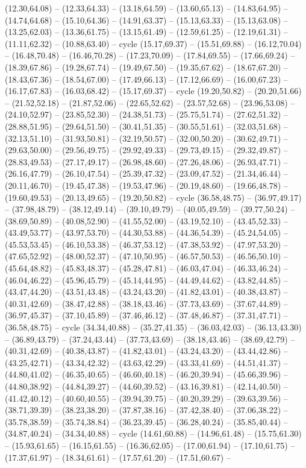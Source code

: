 {(12.30,64.08) -- (12.33,64.33) -- (13.18,64.59) -- (13.60,65.13) -- (14.83,64.95) -- (14.74,64.68) -- (15.10,64.36) -- (14.91,63.37) -- (15.13,63.33) -- (15.13,63.08) -- (13.25,62.03) -- (13.36,61.75) -- (13.15,61.49) -- (12.59,61.25) -- (12.19,61.31) -- (11.11,62.32) -- (10.88,63.40) -- cycle (15.17,69.37) -- (15.51,69.88) -- (16.12,70.04) -- (16.48,70.48) -- (16.46,70.28) -- (17.23,70.09) -- (17.84,69.55) -- (17.66,69.24) -- (18.39,67.86) -- (19.28,67.74) -- (19.49,67.50) -- (19.35,67.62) -- (18.67,67.20) -- (18.43,67.36) -- (18.54,67.00) -- (17.49,66.13) -- (17.12,66.69) -- (16.00,67.23) -- (16.17,67.83) -- (16.03,68.42) -- (15.17,69.37) -- cycle (19.20,50.82) -- (20.20,51.66) -- (21.52,52.18) -- (21.87,52.06) -- (22.65,52.62) -- (23.57,52.68) -- (23.96,53.08) -- (24.10,52.97) -- (23.85,52.30) -- (24.38,51.73) -- (25.75,51.74) -- (27.62,51.32) -- (28.88,51.95) -- (29.64,51.50) -- (30.41,51.35) -- (30.55,51.61) -- (32.03,51.68) -- (32.13,51.10) -- (31.93,50.81) -- (32.19,50.57) -- (32.00,50.20) -- (30.62,49.71) -- (29.63,50.00) -- (29.56,49.75) -- (29.92,49.33) -- (29.73,49.15) -- (29.32,49.87) -- (28.83,49.53) -- (27.17,49.17) -- (26.98,48.60) -- (27.26,48.06) -- (26.93,47.71) -- (26.16,47.79) -- (26.10,47.54) -- (25.39,47.32) -- (23.09,47.52) -- (21.34,46.44) -- (20.11,46.70) -- (19.45,47.38) -- (19.53,47.96) -- (20.19,48.60) -- (19.66,48.78) -- (19.60,49.53) -- (20.13,49.65) -- (19.20,50.82) -- cycle (36.58,48.75) -- (36.97,49.17) -- (37.98,48.79) -- (38.12,49.14) -- (39.10,49.79) -- (40.05,49.59) -- (39.77,50.24) -- (38.69,50.89) -- (40.08,52.90) -- (41.55,52.00) -- (43.19,52.10) -- (43.45,52.33) -- (43.49,53.77) -- (43.97,53.70) -- (44.30,53.88) -- (44.36,54.39) -- (45.24,54.05) -- (45.53,53.45) -- (46.10,53.38) -- (46.37,53.12) -- (47.38,53.92) -- (47.97,53.20) -- (47.65,52.92) -- (48.00,52.37) -- (47.10,50.95) -- (46.57,50.53) -- (46.56,50.10) -- (45.64,48.82) -- (45.83,48.37) -- (45.28,47.81) -- (46.03,47.04) -- (46.33,46.24) -- (46.04,46.22) -- (45.96,45.79) -- (45.14,44.95) -- (44.49,44.62) -- (43.82,44.85) -- (43.47,44.20) -- (43.51,43.48) -- (43.24,43.20) -- (41.82,43.01) -- (40.38,43.87) -- (40.31,42.69) -- (38.47,42.88) -- (38.18,43.46) -- (37.73,43.69) -- (37.67,44.89) -- (36.97,45.37) -- (37.10,45.89) -- (37.46,46.12) -- (37.48,46.87) -- (37.31,47.71) -- (36.58,48.75) -- cycle (34.34,40.88) -- (35.27,41.35) -- (36.03,42.03) -- (36.13,43.30) -- (36.89,43.79) -- (37.24,43.44) -- (37.73,43.69) -- (38.18,43.46) -- (38.69,42.79) -- (40.31,42.69) -- (40.38,43.87) -- (41.82,43.01) -- (43.24,43.20) -- (43.44,42.86) -- (43.25,42.71) -- (43.34,42.32) -- (43.63,42.29) -- (43.33,41.69) -- (44.51,41.37) -- (44.80,41.02) -- (46.35,40.65) -- (46.60,40.18) -- (46.20,39.94) -- (45.66,39.96) -- (44.80,38.92) -- (44.84,39.27) -- (44.60,39.52) -- (43.16,39.81) -- (42.14,40.50) -- (41.42,40.12) -- (40.60,40.55) -- (39.94,39.75) -- (40.20,39.29) -- (39.63,39.56) -- (38.71,39.39) -- (38.23,38.20) -- (37.87,38.16) -- (37.42,38.40) -- (37.06,38.22) -- (35.78,38.59) -- (35.74,38.84) -- (36.23,39.45) -- (36.28,40.24) -- (35.85,40.44) -- (34.87,40.24) -- (34.34,40.88) -- cycle (14.61,60.88) -- (14.96,61.48) -- (15.75,61.30) -- (15.93,61.65) -- (16.15,61.55) -- (16.36,62.05) -- (17.00,61.94) -- (17.10,61.75) -- (17.37,61.97) -- (18.34,61.61) -- (17.57,61.20) -- (17.51,60.67) -- }
